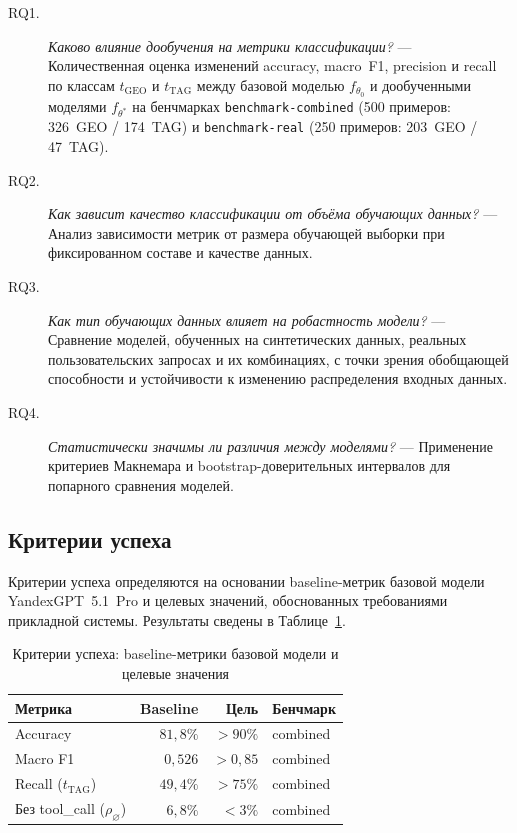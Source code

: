 \begin{description}
    \item[\textsc{RQ1}.] \emph{Каково влияние дообучения на метрики классификации?} --- Количественная оценка изменений accuracy, macro~F1, precision и recall по классам $t_{\mathrm{GEO}}$ и $t_{\mathrm{TAG}}$ между базовой моделью $f_{\theta_0}$ и дообученными моделями $f_{\theta^*}$ на бенчмарках \texttt{benchmark-combined} (500 примеров: 326~GEO / 174~TAG) и \texttt{benchmark-real} (250 примеров: 203~GEO / 47~TAG).

    \item[\textsc{RQ2}.] \emph{Как зависит качество классификации от объёма обучающих данных?} --- Анализ зависимости метрик от размера обучающей выборки при фиксированном составе и качестве данных.

    \item[\textsc{RQ3}.] \emph{Как тип обучающих данных влияет на робастность модели?} --- Сравнение моделей, обученных на синтетических данных, реальных пользовательских запросах и их комбинациях, с точки зрения обобщающей способности и устойчивости к изменению распределения входных данных.

    \item[\textsc{RQ4}.] \emph{Статистически значимы ли различия между моделями?} --- Применение критериев Макнемара и bootstrap-доверительных интервалов для попарного сравнения моделей.
\end{description}

\subsection{Критерии успеха}

Критерии успеха определяются на основании baseline-метрик базовой модели YandexGPT~5.1~Pro и целевых значений, обоснованных требованиями прикладной системы. Результаты сведены в Таблице~\ref{tab:success_criteria}.

\begin{table}[H]
\centering
\caption{Критерии успеха: baseline-метрики базовой модели и целевые значения}
\label{tab:success_criteria}
\def\arraystretch{1.2}
\setlength\tabcolsep{0.4em}
\begin{tabular}{l r r l}
    \toprule
    \textbf{Метрика} & \textbf{Baseline} & \textbf{Цель} & \textbf{Бенчмарк} \\
    \midrule
    Accuracy           & $81{,}8\%$ & $> 90\%$  & combined \\
    Macro F1           & $0{,}526$  & $> 0{,}85$ & combined \\
    Recall ($t_{\mathrm{TAG}}$) & $49{,}4\%$ & $> 75\%$  & combined \\
    Без tool\_call ($\rho_{\varnothing}$) & $6{,}8\%$  & $< 3\%$   & combined \\
    \bottomrule
\end{tabular}
\end{table}


